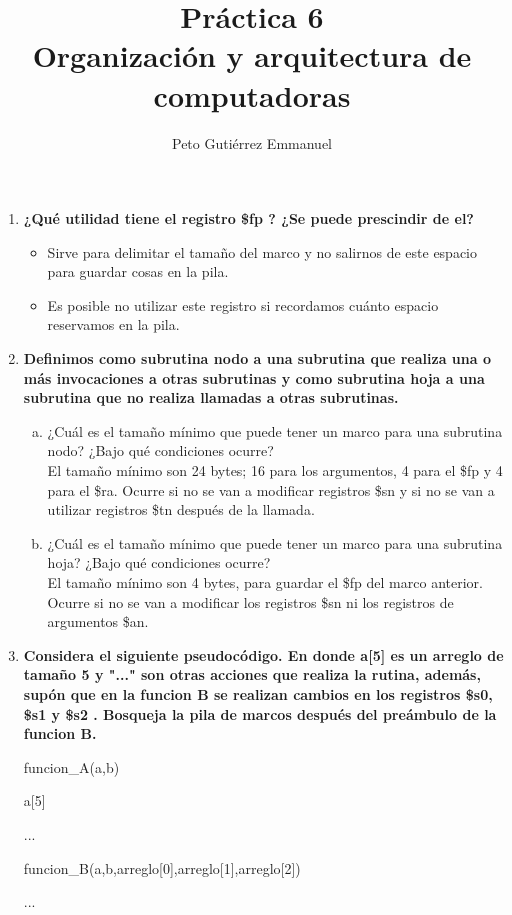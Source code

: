 \documentclass{article}
\title{Práctica 6 \\ Organización y arquitectura de computadoras}
\author{Peto Gutiérrez Emmanuel}
\begin{document}
\maketitle

\begin{enumerate}[1.]
\item \textbf{¿Qué utilidad tiene el registro \$fp ? ¿Se puede prescindir de el?}
	\begin{itemize}
	\item Sirve para delimitar el tamaño del marco y no salirnos de este espacio para guardar cosas en la pila.
	\item Es posible no utilizar este registro si recordamos cuánto espacio reservamos en la pila.
	\end{itemize}

\item \textbf{Definimos como subrutina nodo a una subrutina que realiza una o más invocaciones a otras subrutinas y como subrutina hoja a una subrutina que no realiza llamadas a otras subrutinas.}
	\begin{enumerate}[a)]
	\item ¿Cuál es el tamaño mínimo que puede tener un marco para una subrutina nodo? ¿Bajo qué condiciones ocurre? \\
	
	El tamaño mínimo son 24 bytes; 16 para los argumentos, 4 para el \$fp y 4 para el \$ra. Ocurre si no se van a modificar registros \$sn y si no se van a utilizar registros \$tn después de la llamada.
	\\
	\item ¿Cuál es el tamaño mínimo que puede tener un marco para una subrutina hoja? ¿Bajo qué condiciones ocurre? \\
	
	El tamaño mínimo son 4 bytes, para guardar el \$fp del marco anterior. Ocurre si no se van a modificar los registros \$sn ni los registros de argumentos \$an.
	\end{enumerate}
\item \textbf{Considera el siguiente pseudocódigo. En donde a[5] es un arreglo de tamaño 5 y "..."  son otras acciones que realiza la rutina, además, supón que en la funcion B se realizan cambios en los registros \$s0, \$s1 y \$s2 . Bosqueja la pila de marcos después del preámbulo de la funcion B.}

funcion\_A(a,b)

\hspace{0.5cm}a[5]

\hspace{0.5cm}...

\hspace{0.5cm}funcion\_B(a,b,arreglo[0],arreglo[1],arreglo[2])

\hspace{0.5cm}...
\end{enumerate}
\end{document}
